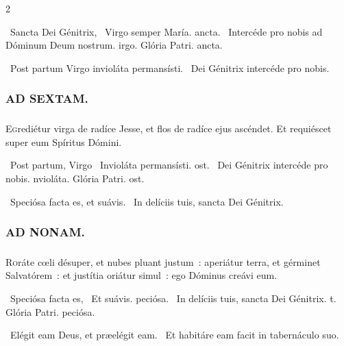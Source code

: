 \documentclass[9pt,twoside]{extarticle}
\begin{document}
\begin{multicols}{2}
\begin{tightlist}{}
~Sancta Dei Génitrix, \textred{*}~Virgo semper María. ancta. ~Intercéde pro nobis ad Dóminum Deum nostrum. irgo. Glória Patri. ancta.
\item {}~Post partum Virgo invioláta permansísti. ~Dei Génitrix intercéde pro nobis.
\end{tightlist}

\subsubsection*{\center \textsc{AD SEXTAM.}}
\subsubsection*{}
\lettrine{E}grediétur virga de radíce Jesse, et flos de radíce ejus ascéndet. Et requiéscet super eum Spíritus Dómini.

\begin{tightlist}{}
\item {}~Post partum, Virgo \textred{*}~Invioláta permansísti. ost. ~Dei Génitrix intercéde pro nobis. nvioláta. Glória Patri. ost.
\item {}~Speciósa facta es, et suávis. ~In delíciis tuis, sancta Dei Génitrix.
\end{tightlist}

\subsubsection*{\center \textsc{AD NONAM.}}
\subsubsection*{}
\lettrine{R}oráte cœli désuper, et nubes pluant justum~: aperiátur terra, et gérminet Salvatórem~: et justítia oriátur simul~: ego Dóminus creávi eum.

\begin{tightlist}{}
\item {}~Speciósa facta es, \textred{*}~Et suávis. peciósa. ~In delíciis tuis, sancta Dei Génitrix. t. Glória Patri. peciósa.
\item {}~Elégit eam Deus, et præelégit eam. ~Et habitáre eam facit in tabernáculo suo.
\end{tightlist}


\end{multicols}
\end{document}
